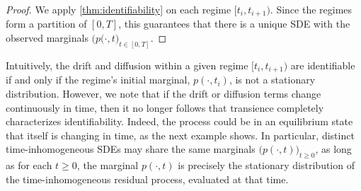 \documentclass[twoside]{article}
\newcommand{\dXt}{\mathrm{d}X_t}
\newcommand{\dYt}{\mathrm{d}Y_t}
\newcommand{\dt}{\mathrm{d}t}
\newcommand{\dWt}{\mathrm{d}W_t}
\newtheorem{ex}[theorem]{Example}
\begin{document}
\begin{proof}
We apply \cref{thm:identifiability} on each regime $[t_i, t_{i+1})$. Since the regimes form a partition of $[0,T]$, this guarantees that there is a unique SDE with the observed marginals $\bigl(p(\cdot, t\bigr)_{t \in [0,T]}$.
\end{proof}

Intuitively, the drift and diffusion within a given regime $[t_i, t_{i+1})$ are identifiable if and only if the regime's initial marginal, $p(\cdot, t_i)$, is not a stationary distribution. However, we note that if the drift or diffusion terms change continuously in time, then it no longer follows that transience completely characterizes identifiability. Indeed, the process could be in an equilibrium state that itself is changing in time, 
as the next example shows. In particular, distinct time-inhomogeneous SDEs may share the same marginals $\bigl(p(\cdot,t)\bigr)_{t \ge 0}$, as long as for each $t\ge0$, the marginal $p(\cdot,t)$ is precisely the stationary distribution of the time-inhomogeneous residual process, evaluated at that time.






\end{document}
